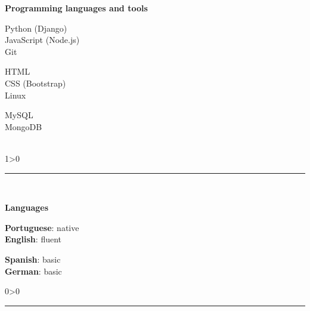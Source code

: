 \documentclass[a4paper,10pt]{article}
\newcommand{\createSection}[4][0]{
    \noindent
	\begin{minipage}{0.16\linewidth}
		\large{\textbf{#2}}
		\vspace{#3\baselineskip}
	\end{minipage}
	\hfill
	\begin{minipage}{0.79\linewidth}
		#4
		\ifnum0#1>0 { \hrule {\ } } \fi
	\end{minipage}
	\vspace{\baselineskip}
}
\begin{document}
    \createSection[1]{Programming languages and tools}{1}{
        \large{\bf
			\begin{minipage}{0.33\linewidth}
				Python (Django)\\
				JavaScript (Node.js)\\
				Git\\
			\end{minipage}
			\begin{minipage}{0.33\linewidth}
				HTML\\
				CSS (Bootstrap)\\
				Linux\\
			\end{minipage}
			\begin{minipage}{0.33\linewidth}
				MySQL\\
				MongoDB\\
				\\
			\end{minipage}
		}
    }
	
	\createSection{Languages}{2}{
	    \large{
			\begin{minipage}{0.5\linewidth}
				\textbf{Portuguese}: native \\
				\textbf{English}: fluent \\
			\end{minipage}
			\begin{minipage}{0.5\linewidth}
				\textbf{Spanish}: basic \\
				\textbf{German}: basic \\
			\end{minipage}
		}
	}
    \label{lastPage}
\end{document}

